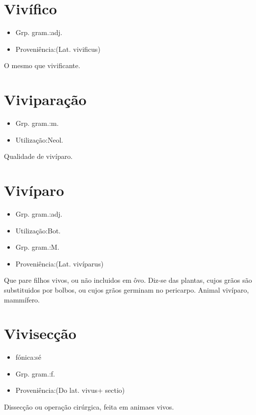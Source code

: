 \documentclass{article}
\begin{document}
\section{Vivífico}
\begin{itemize}
\item {Grp. gram.:adj.}
\end{itemize}
\begin{itemize}
\item {Proveniência:(Lat. \textunderscore vivificus\textunderscore )}
\end{itemize}
O mesmo que \textunderscore vivificante\textunderscore .
\section{Viviparação}
\begin{itemize}
\item {Grp. gram.:m.}
\end{itemize}
\begin{itemize}
\item {Utilização:Neol.}
\end{itemize}
Qualidade de vivíparo.
\section{Vivíparo}
\begin{itemize}
\item {Grp. gram.:adj.}
\end{itemize}
\begin{itemize}
\item {Utilização:Bot.}
\end{itemize}
\begin{itemize}
\item {Grp. gram.:M.}
\end{itemize}
\begin{itemize}
\item {Proveniência:(Lat. \textunderscore vivíparus\textunderscore )}
\end{itemize}
Que pare filhos vivos, ou não incluidos em ôvo.
Diz-se das plantas, cujos grãos são substituidos por bolbos, ou cujos grãos germinam no pericarpo.
Animal vivíparo, mammífero.
\section{Vivisecção}
\begin{itemize}
\item {fónica:sé}
\end{itemize}
\begin{itemize}
\item {Grp. gram.:f.}
\end{itemize}
\begin{itemize}
\item {Proveniência:(Do lat. \textunderscore vivus\textunderscore  + \textunderscore sectio\textunderscore )}
\end{itemize}
Dissecção ou operação cirúrgica, feita em animaes vivos.
\end{document}
